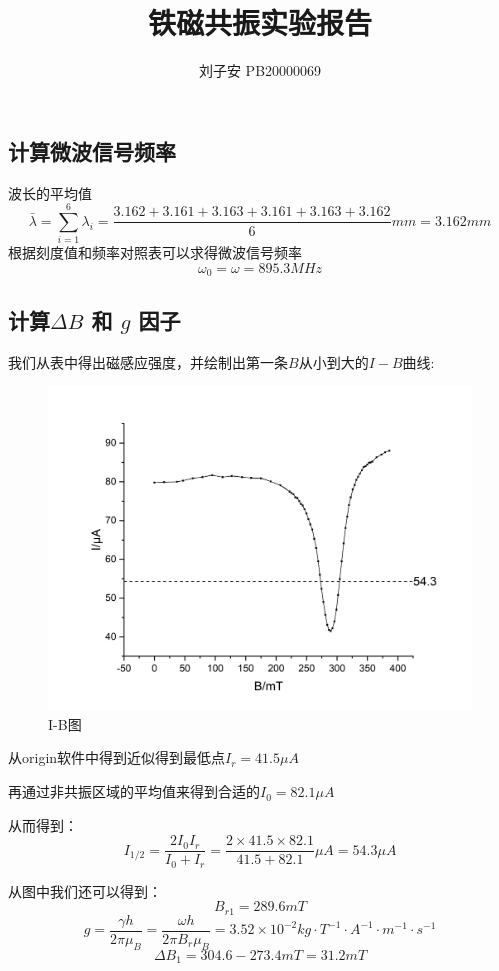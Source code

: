 \documentclass[UTF8]{ctexart}
\title{铁磁共振实验报告}
\author{刘子安 PB20000069}
\begin{document}
\maketitle

\subsection{计算微波信号频率}

波长的平均值
$$\bar{\lambda} = \sum_{i=1}^{6}\lambda_i=\frac{3.162+3.161+3.163+3.161+3.163+3.162}{6}mm=3.162mm $$
根据刻度值和频率对照表可以求得微波信号频率
$$ \omega_0=\omega=895.3MHz$$

\subsection{计算$\Delta B$ 和 $g$ 因子}
我们从表中得出磁感应强度，并绘制出第一条$B$从小到大的$I-B$曲线: 

\begin{figure}[htbp]
	\centering
	\includegraphics[scale=0.25]{Graph3.png}
	\caption{I-B图}
\end{figure}

从origin软件中得到近似得到最低点$I_r=41.5{\mu}A$

再通过非共振区域的平均值来得到合适的$I_0=82.1\mu{A}$

从而得到：
$$
I_{1/2}=\frac{2I_0I_r}{I_0+I_r}=\frac{2\times41.5\times82.1}{41.5+82.1}\mu{A}=54.3\mu{A}
$$

从图中我们还可以得到：
$$B_{r1} = 289.6mT$$
$$g = \frac{\gamma{h}}{2\pi\mu_B} = \frac{\omega{h}}{2\pi B_r \mu_B} = 3.52 \times 10^{-2} kg \cdot T^{-1} \cdot A^{-1}\cdot m^{-1}\cdot s^{-1}$$
$$ \Delta B_1 = 304.6 - 273.4 mT = 31.2 mT $$
\end{document}
